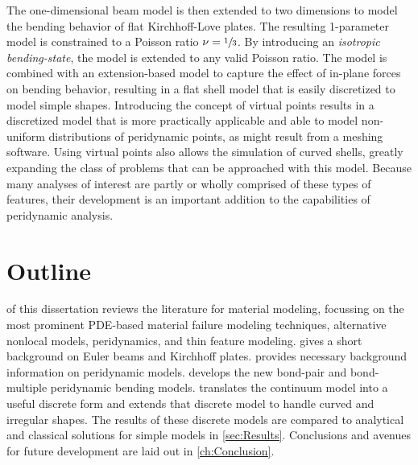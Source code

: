 The one-dimensional beam model is then extended to two dimensions to model the bending behavior of flat Kirchhoff-Love plates.
The resulting 1-parameter model is constrained to a Poisson ratio \(\nu=\sfrac{1}{3}\).  
By introducing an \emph{isotropic bending-state}, the model is extended to any valid Poisson ratio.  
The model is combined with an extension-based model to capture the effect of in-plane forces on bending behavior, resulting in a flat shell model that is easily discretized to model simple shapes.
Introducing the concept of virtual points results in a discretized model that is more practically applicable and able to model non-uniform distributions of peridynamic points, as might result from a meshing software.
Using virtual points also allows the simulation of curved shells, greatly expanding the class of problems that can be approached with this model.
Because many analyses of interest are partly or wholly comprised of these types of features, their development is an important addition to the capabilities of peridynamic analysis.

\section{Outline}

 of this dissertation reviews the literature for material modeling, focussing on the most prominent PDE-based material failure modeling techniques, alternative nonlocal models, peridynamics, and thin feature modeling.  gives a short background on Euler beams and Kirchhoff plates.   provides necessary background information on peridynamic models.   develops the new bond-pair and bond-multiple peridynamic bending models.  translates the continuum model into a useful discrete form and extends that discrete model to handle curved and irregular shapes. The results of these discrete models are compared to analytical and classical solutions for simple models in \cref{sec:Results}. Conclusions and avenues for future development are laid out in \cref{ch:Conclusion}.
